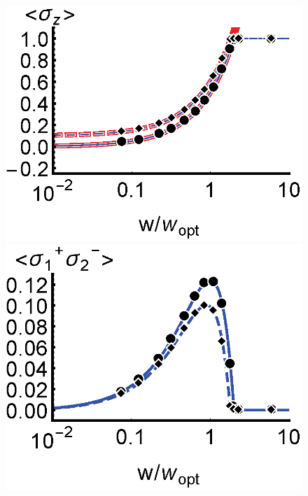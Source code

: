 \documentclass[aps,prl,twocolumn,
superscriptaddress,groupedaddress]{revtex4}
\begin{document}
\begin{figure}
\begin{center}
	\includegraphics[scale =0.445] {N10000SZ.eps}
	\hspace{-5.0mm} \includegraphics[scale =0.445] {N10000SPSM.eps}

\end{center}
\end{figure}
\end{document}
